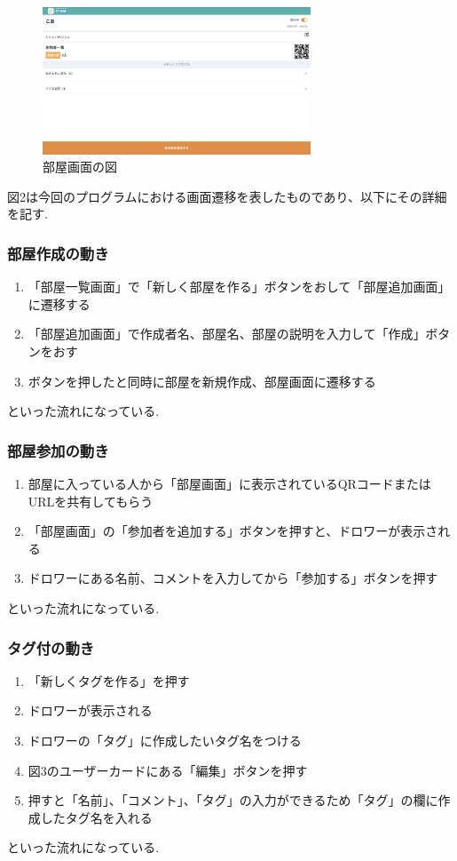 \documentclass[submit,techrep]{ipsj}
\begin{document}
\begin{figure}[htbp]
  \centering
 \includegraphics[width=8cm]{./images/room_screen.jpg}
  \caption{部屋画面の図}
  \label{fig:sample}
\end{figure}


図2は今回のプログラムにおける画面遷移を表したものであり、以下にその詳細を記す.
\subsubsection{部屋作成の動き}
\begin{enumerate}
  \item 「部屋一覧画面」で「新しく部屋を作る」ボタンをおして「部屋追加画面」に遷移する
  \item 「部屋追加画面」で作成者名、部屋名、部屋の説明を入力して「作成」ボタンをおす
  \item  ボタンを押したと同時に部屋を新規作成、部屋画面に遷移する
 \end{enumerate}
といった流れになっている.

\subsubsection{部屋参加の動き}
\begin{enumerate}
  \item 部屋に入っている人から「部屋画面」に表示されているQRコードまたはURLを共有してもらう
  \item 「部屋画面」の「参加者を追加する」ボタンを押すと、ドロワーが表示される
  \item  ドロワーにある名前、コメントを入力してから「参加する」ボタンを押す
 \end{enumerate}
といった流れになっている.

\subsubsection{タグ付の動き}
\begin{enumerate}
  \item 「新しくタグを作る」を押す
  \item ドロワーが表示される
  \item ドロワーの「タグ」に作成したいタグ名をつける
  \item 図3のユーザーカードにある「編集」ボタンを押す
  \item 押すと「名前」、「コメント」、「タグ」の入力ができるため「タグ」の欄に作成したタグ名を入れる
 \end{enumerate}
といった流れになっている.
\end{document}
